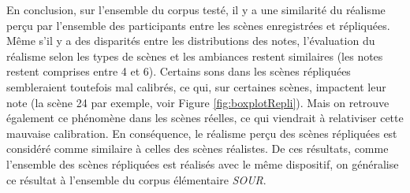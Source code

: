 {En conclusion, sur l'ensemble du corpus testé, il y a une similarité du réalisme perçu par l'ensemble des participants entre les scènes enregistrées et répliquées. Même s'il y a des disparités entre les distributions des notes, l'évaluation du réalisme selon les types de scènes et les ambiances restent similaires (les notes restent comprises entre 4 et 6). 
Certains sons dans les scènes répliquées sembleraient toutefois mal calibrés, ce qui, sur certaines scènes, impactent leur note (la scène 24 par exemple, voir Figure \ref{fig:boxplotRepli}). Mais on retrouve également ce phénomène dans les scènes réelles, ce qui viendrait à relativiser cette mauvaise calibration.
En conséquence, le réalisme perçu des scènes répliquées est considéré comme similaire à celles des scènes réalistes. 
De ces résultats, comme l'ensemble des scènes répliquées est réalisés avec le même dispositif, on généralise ce résultat à l'ensemble du corpus élémentaire \textit{SOUR}.\\

}
